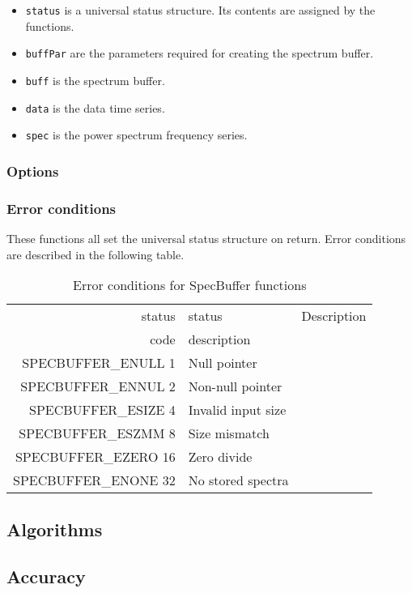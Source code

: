 \documentclass{article}
\begin{document}
\begin{itemize}
\item \texttt{status} is a universal status structure.  Its contents are
assigned by the functions.
\item \texttt{buffPar} are the parameters required for creating the spectrum
buffer.
\item \texttt{buff} is the spectrum buffer.
\item \texttt{data} is the data time series.
\item \texttt{spec} is the power spectrum frequency series.
\end{itemize}

\subsubsection{Options}

\subsubsection{Error conditions}

These functions all set the universal status structure on return.
Error conditions are described in the following table.

\begin{table}
\begin{tabular}{|r|l|p{2in}|}\hline
status  & status          & Description\\
code    & description     & \\\hline
SPECBUFFER\_ENULL 1  & Null pointer & \\
SPECBUFFER\_ENNUL 2  & Non-null pointer & \\
SPECBUFFER\_ESIZE 4  & Invalid input size & \\
SPECBUFFER\_ESZMM 8  & Size mismatch & \\
SPECBUFFER\_EZERO 16 & Zero divide & \\
SPECBUFFER\_ENONE 32 & No stored spectra & \\
\hline
\end{tabular}
\caption{Error conditions for SpecBuffer functions}\label{tbl:CV}
\end{table}

\subsection{Algorithms}

\subsection{Accuracy}
\end{document}
